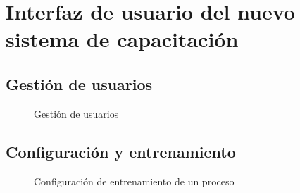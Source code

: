 {\chapter{Interfaz de usuario del nuevo sistema de capacitación}

\section{Gestión de usuarios}
\begin{figure}[H]
\centering
 \caption{Gestión de usuarios}
 \label{fig:gestionUss} 
\end{figure}


\section{Configuración y entrenamiento}
\begin{figure}[H]
\centering
 \caption{Configuración de entrenamiento de un proceso}
 \label{fig:confEn} 
\end{figure}

}
